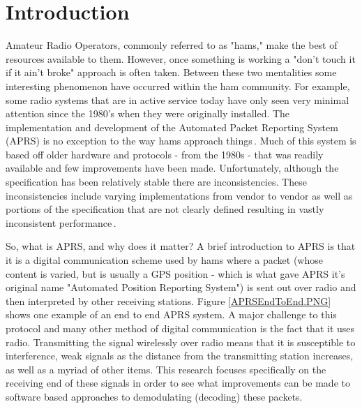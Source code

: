 \chapter{Introduction}

Amateur Radio Operators, commonly referred to as "hams," make the best of resources available to them. However, once something is working a "don't touch it if it ain't broke" approach is often taken. Between these two mentalities some interesting phenomenon have occurred within the ham community. For example, some radio systems that are in active service today have only seen very minimal attention since the 1980's when they were originally installed. The implementation and development of the Automated Packet Reporting System (APRS) is no exception to the way hams approach things\,\cite{Bruninga}. Much of this system is based off older hardware and protocols - from the 1980s - that was readily available and few improvements have been made. Unfortunately, although the specification has been relatively stable there are inconsistencies. These inconsistencies include varying implementations from vendor to vendor as well as portions of the specification that are not clearly defined resulting in vastly inconsistent performance\,\cite{KWFThesis, KWFTAPR}.

So, what is APRS, and why does it matter? A brief introduction to APRS is that it is a digital communication scheme used by hams where a packet (whose content is varied, but is usually a GPS position - which is what gave APRS it's original name "Automated Position Reporting System"\cite{WikiAPRS}) is sent out over radio and then interpreted by other receiving stations. Figure \ref{APRSEndToEnd.PNG} shows one example of an end to end APRS system. A major challenge to this protocol and many other method of digital communication is the fact that it uses radio. Transmitting the signal wirelessly over radio means that it is susceptible to interference, weak signals as the distance from the transmitting station increases, as well as a myriad of other items. This research focuses specifically on the receiving end of these signals in order to see what improvements can be made to software based approaches to demodulating (decoding) these packets.

